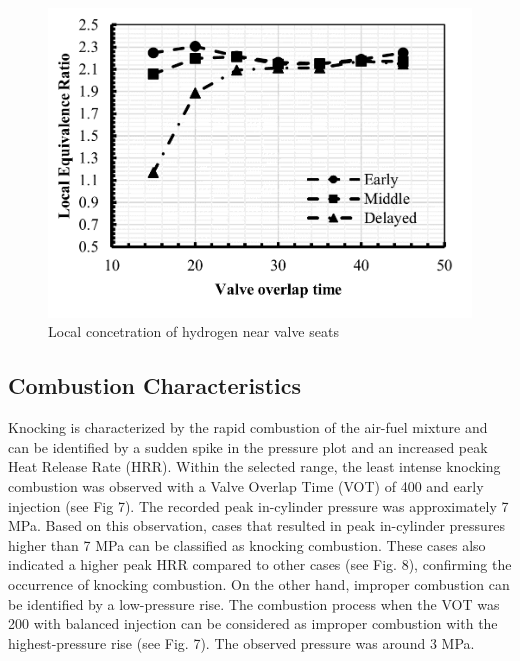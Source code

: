 \documentclass[conference]{IEEEtran}
\begin{document}
    \begin{figure}[htbp]
        \centerline{\includegraphics{plots and graphs/6.png}}
        \caption{Local concetration of hydrogen near valve seats}
        \label{plt_6}
        \end{figure}
    

\subsection{Combustion Characteristics}
Knocking is characterized by the rapid combustion of the air-fuel mixture and can be identified by a sudden spike in the pressure plot and an increased peak Heat Release Rate (HRR). Within the selected range, the least intense knocking combustion was observed with a Valve Overlap Time (VOT) of 400 and early injection (see Fig 7). The recorded peak in-cylinder pressure was approximately 7 MPa. Based on this observation, cases that resulted in peak in-cylinder pressures higher than 7 MPa can be classified as knocking combustion. These cases also indicated a higher peak HRR compared to other cases (see Fig. 8), confirming the occurrence of knocking combustion. On the other hand, improper combustion can be identified by a low-pressure rise. The combustion process when the VOT was 200 with balanced injection can be considered as improper combustion with the highest-pressure rise (see Fig. 7). The observed pressure was around 3 MPa.
\end{document}
